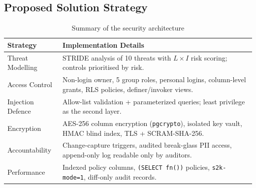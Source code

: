 \documentclass[11pt,a4paper]{report}
\begin{document}
\subsection{Proposed Solution Strategy}
\begin{table}[H]
    \centering
    \caption{Summary of the security architecture}
    \vspace{2mm}
    \begin{tabular}{|l|p{10cm}|}
        \hline
        \textbf{Strategy} & \textbf{Implementation Details} \\ \hline
        Threat Modelling & STRIDE analysis of 10 threats with $L \times I$ risk scoring; controls prioritised by risk. \\ \hline
        Access Control & Non-login owner, 5 group roles, personal logins, column-level grants, RLS policies, definer/invoker views. \\ \hline
        Injection Defence & Allow-list validation + parameterized queries; least privilege as the second layer. \\ \hline
        Encryption & AES-256 column encryption (\texttt{pgcrypto}), isolated key vault, HMAC blind index, TLS + SCRAM-SHA-256. \\ \hline
        Accountability & Change-capture triggers, audited break-glass PII access, append-only log readable only by auditors. \\ \hline
        Performance & Indexed policy columns, \texttt{(SELECT fn())} policies, \texttt{s2k-mode=1}, diff-only audit records. \\ \hline
    \end{tabular}
\end{table}
\end{document}
